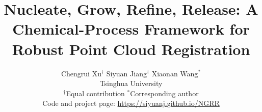 \documentclass[10pt,twocolumn,letterpaper]{article}
\title{Nucleate, Grow, Refine, Release: A Chemical-Process Framework for Robust Point Cloud Registration}
\author{Chengrui Xu$^{\dagger}$ \qquad Siyuan Jiang$^{\dagger}$ \qquad Xiaonan Wang$^{*}$\\
Tsinghua University\\
{\small $^{\dagger}$Equal contribution \qquad $^{*}$Corresponding author}\\
{\small Code and project page: \url{https://siyuanj.github.io/NGRR}}}
\begin{document}

\begingroup
\renewcommand{\abstract}{\iftoggle{cvprpagenumbers}{}{\thispagestyle{empty}}\noindent\it\ignorespaces}
\renewcommand{\endabstract}{\par\vspace*{12pt}}

\endgroup





\label{page:bodyend}

\clearpage
\label{page:backmatter}

{
    \small
    
    
}


\clearpage
\setcounter{section}{0}
\setcounter{figure}{0}
\setcounter{table}{0}
\setcounter{equation}{0}
\renewcommand{\thesection}{S\arabic{section}}
\renewcommand{\thefigure}{S\arabic{figure}}
\renewcommand{\thetable}{S\arabic{table}}
\renewcommand{\theequation}{S\arabic{equation}}
\renewcommand{\theHsection}{S\arabic{section}}
\renewcommand{\theHfigure}{S\arabic{figure}}
\renewcommand{\theHtable}{S\arabic{table}}
\renewcommand{\theHequation}{S\arabic{equation}}
\maketitlesupplementary
\FloatBarrier
\FloatBarrier
\FloatBarrier
\FloatBarrier
\FloatBarrier
\FloatBarrier
\FloatBarrier
\FloatBarrier
\FloatBarrier
\FloatBarrier
\end{document}
